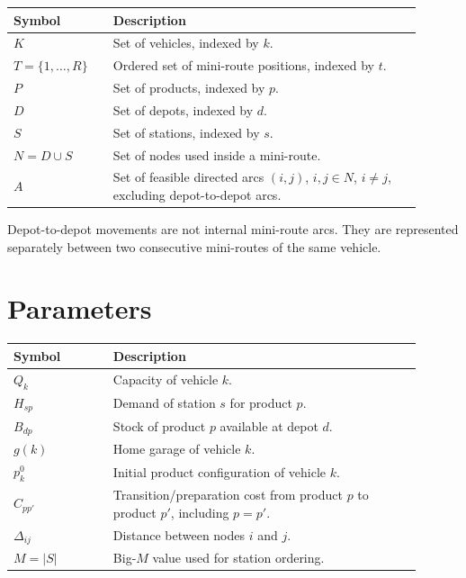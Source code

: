 \documentclass[11pt,a4paper]{article}
\begin{document}
\begin{table}[h]
\centering
\begin{tabular}{p{0.22\linewidth}p{0.68\linewidth}}
\toprule
Symbol & Description \\
\midrule
\(K\) & Set of vehicles, indexed by \(k\). \\
\(T=\{1,\ldots,R\}\) & Ordered set of mini-route positions, indexed by \(t\). \\
\(P\) & Set of products, indexed by \(p\). \\
\(D\) & Set of depots, indexed by \(d\). \\
\(S\) & Set of stations, indexed by \(s\). \\
\(N=D \cup S\) & Set of nodes used inside a mini-route. \\
\(A\) & Set of feasible directed arcs \((i,j)\), \(i,j \in N\), \(i\neq j\), excluding depot-to-depot arcs. \\
\bottomrule
\end{tabular}
\end{table}

Depot-to-depot movements are not internal mini-route arcs. They are represented
separately between two consecutive mini-routes of the same vehicle.

\section{Parameters}

\begin{table}[h]
\centering
\begin{tabular}{p{0.22\linewidth}p{0.68\linewidth}}
\toprule
Symbol & Description \\
\midrule
\(Q_k\) & Capacity of vehicle \(k\). \\
\(H_{sp}\) & Demand of station \(s\) for product \(p\). \\
\(B_{dp}\) & Stock of product \(p\) available at depot \(d\). \\
\(g(k)\) & Home garage of vehicle \(k\). \\
\(p^0_k\) & Initial product configuration of vehicle \(k\). \\
\(C_{pp'}\) & Transition/preparation cost from product \(p\) to product \(p'\), including \(p=p'\). \\
\(\Delta_{ij}\) & Distance between nodes \(i\) and \(j\). \\
\(M=|S|\) & Big-\(M\) value used for station ordering. \\
\bottomrule
\end{tabular}
\end{table}
\end{document}
